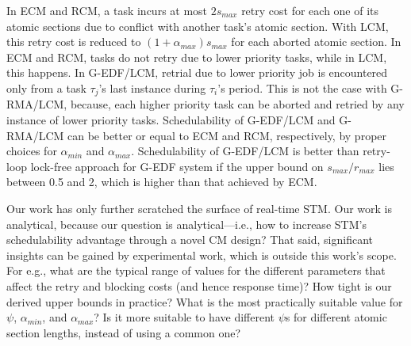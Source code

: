 \documentclass[conference]{IEEEtran}
\begin{document}
In ECM and RCM, a task incurs at most $2s_{max}$ retry cost for each one of its atomic sections due to conflict
with another task's atomic section. With LCM, this retry cost is reduced to $(1+\alpha_{max})s_{max}$ for each aborted atomic section. In ECM and RCM, tasks do not retry due to lower priority tasks, while in LCM, this happens. In G-EDF/LCM, retrial due to lower priority job is encountered only from a task $\tau_{j}$'s last instance during $\tau_{i}$'s period. This is not the case with G-RMA/LCM, because,  each higher priority task can be aborted and retried by any instance of lower priority tasks. Schedulability of G-EDF/LCM and G-RMA/LCM can be better or equal to ECM and RCM, respectively, by proper choices for $\alpha_{min}$ and $\alpha_{max}$. Schedulability of G-EDF/LCM is better than retry-loop lock-free approach for G-EDF system if the upper bound on $s_{max}/r_{max}$ lies between 0.5 and 2, which is higher than that achieved by ECM.

Our work has only further scratched the surface of real-time STM. Our work is analytical, because our question is analytical---i.e., how to increase STM's schedulability advantage through a novel CM design? That said, significant insights can be gained by experimental work, which is outside this work's  scope. For e.g., what are the typical range of values for the different parameters that affect the retry and blocking costs (and hence response time)? How tight is our derived upper bounds in practice? 
What is the most practically suitable
value for $\psi$, $\alpha_{min}$, and $\alpha_{max}$? Is it more suitable to have different $\psi$s for different atomic section lengths, instead of using a common one? 


%
%



\end{document}

